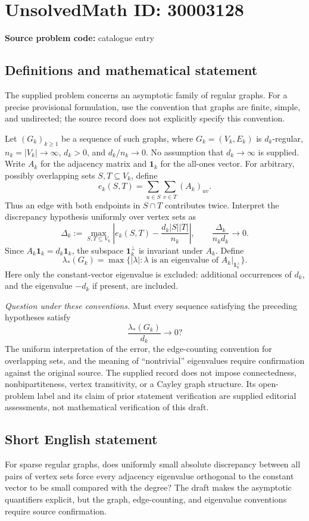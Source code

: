 \documentclass[11pt]{article}
\begin{document}
\section*{UnsolvedMath ID: 30003128}
\textbf{Source problem code:} catalogue entry
\subsection{Definitions and mathematical statement}
The supplied problem concerns an asymptotic family of regular graphs. For a precise provisional formulation, use the convention that graphs are finite, simple, and undirected; the source record does not explicitly specify this convention.

Let \((G_k)_{k\geq 1}\) be a sequence of such graphs, where \(G_k=(V_k,E_k)\) is \(d_k\)-regular, \(n_k=|V_k|\to\infty\), \(d_k>0\), and \(d_k/n_k\to 0\). No assumption that \(d_k\to\infty\) is supplied. Write \(A_k\) for the adjacency matrix and \(\mathbf{1}_k\) for the all-ones vector. For arbitrary, possibly overlapping sets \(S,T\subseteq V_k\), define
\[
 e_k(S,T)=\sum_{u\in S}\sum_{v\in T}(A_k)_{uv}.
\]
Thus an edge with both endpoints in \(S\cap T\) contributes twice. Interpret the discrepancy hypothesis uniformly over vertex sets as
\[
 \Delta_k:=\max_{S,T\subseteq V_k}
 \left|e_k(S,T)-\frac{d_k|S||T|}{n_k}\right|,
 \qquad \frac{\Delta_k}{n_kd_k}\longrightarrow 0.
\]
Since \(A_k\mathbf{1}_k=d_k\mathbf{1}_k\), the subspace \(\mathbf{1}_k^\perp\) is invariant under \(A_k\). Define
\[
 \lambda_*(G_k)=\max\bigl\{|\lambda|:\lambda\text{ is an eigenvalue of }A_k|_{\mathbf{1}_k^\perp}\bigr\}.
\]
Here only the constant-vector eigenvalue is excluded: additional occurrences of \(d_k\), and the eigenvalue \(-d_k\) if present, are included.

\emph{Question under these conventions.} Must every sequence satisfying the preceding hypotheses satisfy
\[
 \frac{\lambda_*(G_k)}{d_k}\longrightarrow 0?
\]
The uniform interpretation of the error, the edge-counting convention for overlapping sets, and the meaning of ``nontrivial'' eigenvalues require confirmation against the original source. The supplied record does not impose connectedness, nonbipartiteness, vertex transitivity, or a Cayley graph structure. Its open-problem label and its claim of prior statement verification are supplied editorial assessments, not mathematical verification of this draft.
\subsection{Short English statement}
For sparse regular graphs, does uniformly small absolute discrepancy between all pairs of vertex sets force every adjacency eigenvalue orthogonal to the constant vector to be small compared with the degree? The draft makes the asymptotic quantifiers explicit, but the graph, edge-counting, and eigenvalue conventions require source confirmation.
\end{document}
